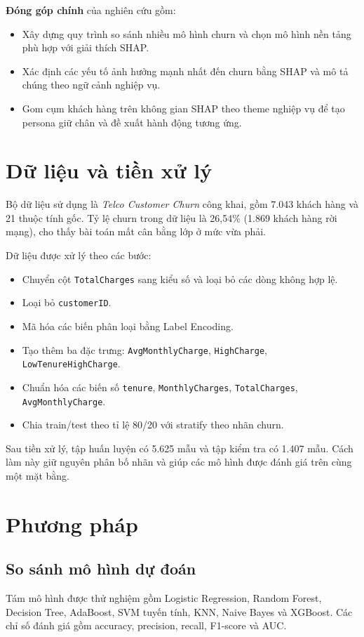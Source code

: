﻿\documentclass[conference]{IEEEtran}
\begin{document}
\textbf{Đóng góp chính} của nghiên cứu gồm:
\begin{itemize}[leftmargin=*]
    \item Xây dựng quy trình so sánh nhiều mô hình churn và chọn mô hình nền tảng phù hợp với giải thích SHAP.
    \item Xác định các yếu tố ảnh hưởng mạnh nhất đến churn bằng SHAP và mô tả chúng theo ngữ cảnh nghiệp vụ.
    \item Gom cụm khách hàng trên không gian SHAP theo theme nghiệp vụ để tạo persona giữ chân và đề xuất hành động tương ứng.
\end{itemize}

\section{Dữ liệu và tiền xử lý}
Bộ dữ liệu sử dụng là \emph{Telco Customer Churn} công khai, gồm 7.043 khách hàng và 21 thuộc tính gốc. Tỷ lệ churn trong dữ liệu là 26,54\% (1.869 khách hàng rời mạng), cho thấy bài toán mất cân bằng lớp ở mức vừa phải.

Dữ liệu được xử lý theo các bước:
\begin{itemize}[leftmargin=*]
    \item Chuyển cột \texttt{TotalCharges} sang kiểu số và loại bỏ các dòng không hợp lệ.
    \item Loại bỏ \texttt{customerID}.
    \item Mã hóa các biến phân loại bằng Label Encoding.
    \item Tạo thêm ba đặc trưng: \texttt{AvgMonthlyCharge}, \texttt{HighCharge}, \texttt{LowTenureHighCharge}.
    \item Chuẩn hóa các biến số \texttt{tenure}, \texttt{MonthlyCharges}, \texttt{TotalCharges}, \texttt{AvgMonthlyCharge}.
    \item Chia train/test theo tỉ lệ 80/20 với stratify theo nhãn churn.
\end{itemize}

Sau tiền xử lý, tập huấn luyện có 5.625 mẫu và tập kiểm tra có 1.407 mẫu. Cách làm này giữ nguyên phân bố nhãn và giúp các mô hình được đánh giá trên cùng một mặt bằng.

\section{Phương pháp}
\subsection{So sánh mô hình dự đoán}
Tám mô hình được thử nghiệm gồm Logistic Regression, Random Forest, Decision Tree, AdaBoost, SVM tuyến tính, KNN, Naive Bayes và XGBoost. Các chỉ số đánh giá gồm accuracy, precision, recall, F1-score và AUC.
\end{document}
